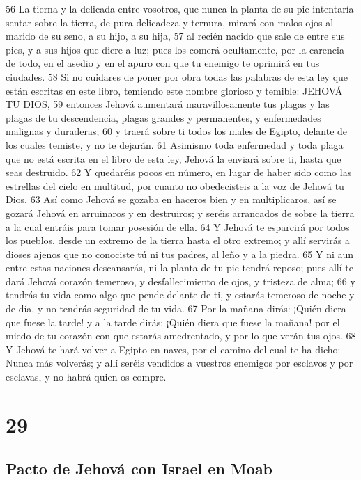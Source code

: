 56 La tierna y la delicada entre vosotros, que nunca la planta de su pie intentaría sentar sobre la tierra, de pura delicadeza y ternura, mirará con malos ojos al marido de su seno, a su hijo, a su hija,
57 al recién nacido que sale de entre sus pies, y a sus hijos que diere a luz; pues los comerá ocultamente, por la carencia de todo, en el asedio y en el apuro con que tu enemigo te oprimirá en tus ciudades.
58 Si no cuidares de poner por obra todas las palabras de esta ley que están escritas en este libro, temiendo este nombre glorioso y temible: JEHOVÁ TU DIOS,
59 entonces Jehová aumentará maravillosamente tus plagas y las plagas de tu descendencia, plagas grandes y permanentes, y enfermedades malignas y duraderas;
60 y traerá sobre ti todos los males de Egipto, delante de los cuales temiste, y no te dejarán.
61 Asimismo toda enfermedad y toda plaga que no está escrita en el libro de esta ley, Jehová la enviará sobre ti, hasta que seas destruido.
62 Y quedaréis pocos en número, en lugar de haber sido como las estrellas del cielo en multitud, por cuanto no obedecisteis a la voz de Jehová tu Dios.
63 Así como Jehová se gozaba en haceros bien y en multiplicaros, así se gozará Jehová en arruinaros y en destruiros; y seréis arrancados de sobre la tierra a la cual entráis para tomar posesión de ella.
64 Y Jehová te esparcirá por todos los pueblos, desde un extremo de la tierra hasta el otro extremo; y allí servirás a dioses ajenos que no conociste tú ni tus padres, al leño y a la piedra.
65 Y ni aun entre estas naciones descansarás, ni la planta de tu pie tendrá reposo; pues allí te dará Jehová corazón temeroso, y desfallecimiento de ojos, y tristeza de alma;
66 y tendrás tu vida como algo que pende delante de ti, y estarás temeroso de noche y de día, y no tendrás seguridad de tu vida.
67 Por la mañana dirás: ¡Quién diera que fuese la tarde! y a la tarde dirás: ¡Quién diera que fuese la mañana! por el miedo de tu corazón con que estarás amedrentado, y por lo que verán tus ojos.
68 Y Jehová te hará volver a Egipto en naves, por el camino del cual te ha dicho: Nunca más volverás; y allí seréis vendidos a vuestros enemigos por esclavos y por esclavas, y no habrá quien os compre.

\chapter{29}

\section{Pacto de Jehová con Israel en Moab}

